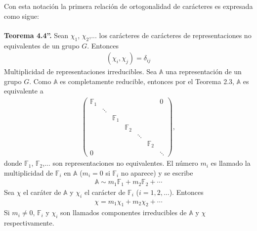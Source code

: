 \documentclass[12pt]{book}
\theoremstyle{definition}
\newcounter{in}
\begin{document}
Con esta notación la primera relación de ortogonalidad de carácteres es expresada como sigue:\\~\\
\textbf{Teorema 4.4''. } Sean $\chi_{1}$, $\chi_{2}$,... los carácteres de carácteres de representaciones no equivalentes de un grupo $G$. Entonces
\begin{equation*}
\begin{aligned}
(\chi_{i},\chi_{j})=\delta_{ij}
\end{aligned}
\end{equation*} 
Multiplicidad de representaciones irreducibles. Sea $\mathbb{A}$ una representación de un grupo $G$. Como $\mathbb{A}$ es completamente reducible, entonces por el Teorema 2.3, $\mathbb{A}$ es equivalente a 
\begin{equation*}
\begin{aligned}
\begin{pmatrix}
\mathbb{F}_{1} & & & & & & 0\\ 
 & \ddots & & & & & \\
 & & \mathbb{F}_{1} & & & & \\
 & & & \mathbb{F}_{2} & & & \\
 & & & & \ddots & & \\
 & & & & & \mathbb{F}_{2} & \\
0 & & & & & & \ddots
\end{pmatrix},
\end{aligned}
\end{equation*}
donde $\mathbb{F}_{1}$, $\mathbb{F}_{2}$,... son representaciones no equivalentes. El número $m_{i}$ es llamado la multiplicidad de $\mathbb{F}_{i}$ en $\mathbb{A}$ ($m_{i}=0$ si $\mathbb{F}_{i}$ no aparece) y se escribe 
\begin{equation*}
\begin{aligned}
\mathbb{A} \sim m_{1} \mathbb{F}_{1}+m_{2} \mathbb{F}_{2}+ \cdots
\end{aligned}
\end{equation*}
Sea $\chi$ el caráter de $\mathbb{A}$ y $\chi_{i}$ el carácter de $\mathbb{F}_{i}$ ($i = 1, 2, ...$). Entonces
\begin{equation*}
\begin{aligned}
\chi =m_{1} \chi_{1}+ m_{2} \chi_{2}+ \cdots
\end{aligned}
\end{equation*}
Si $m_{i} \neq 0$, $\mathbb{F}_{i}$ y $\chi_{i}$ son llamados componentes irreducibles de $\mathbb{A}$ y $\chi$ respectivamente.\\~\\
\end{document}

